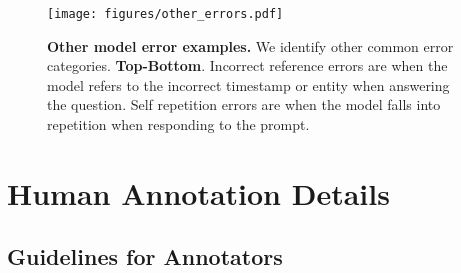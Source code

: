 \begin{figure*}[ht!]
    \centering
    \texttt{[image: figures/other\_errors.pdf]}
    \caption{\textbf{Other model error examples.} We identify other common error categories. \textbf{Top-Bottom}. Incorrect reference errors are when the model refers to the incorrect timestamp or entity when answering the question. Self repetition errors are when the model falls into repetition when responding to the prompt. }
    \label{fig:other_errors}
\end{figure*}

\section{Human Annotation Details}\label{app:annotation_details}
\subsection{Guidelines for Annotators}

